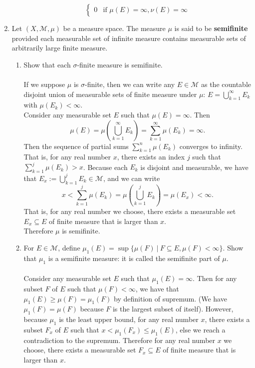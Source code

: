 \begin{enumerate}
\begin{enumerate}[label=(\roman*),align=left]
\[\begin{cases}
			0&\text{if }\mu(E)=\infty,\nu(E)=\infty
		\end{cases}
		\]
	\end{enumerate}
	\item Let $(X,\mathcal{M},\mu)$ be a measure space.
	The measure $\mu$ is said to be \textbf{semifinite} provided each measurable set of infinite measure contains measurable sets of arbitrarily large finite measure.
	\begin{enumerate}[label=(\roman*),align=left]  
		\item Show that each $\sigma$-finite measure is semifinite.\\
		\\If we suppose $\mu$ is $\sigma$-finite, then we can write any $E\in\mathcal{M}$ as the countable disjoint union of measurable sets of finite measure under $\mu$:
		$E=\bigcup_{k=1}^\infty E_k$ with $\mu(E_k)<\infty$.
		\\Consider any measurable set $E$ such that $\mu(E)=\infty$.
		Then 
		\[
			\mu(E)=\mu(\bigcup_{k=1}^\infty E_k)=\sum_{k=1}^\infty \mu(E_k)=\infty.
		\]
		Then the sequence of partial sums $\sum_{k=1}^n \mu(E_k)$ converges to infinity.
		That is, for any real number $x$, there exists an index $j$ such that $\sum_{k=1}^j \mu(E_k)>x$.
		Because each $E_k$ is disjoint and measurable, we have that $E_x:=\bigcup_{k=1}^j E_k\in\mathcal{M}$, and we can write
		\[
			x<\sum_{k=1}^j \mu(E_k)=\mu(\bigcup_{k=1}^j E_k)=\mu(E_x)<\infty.
		\]
		That is, for any real number we choose, there exists a measurable set $E_x\subseteq E$ of finite measure that is larger than $x$.
		\\Therefore $\mu$ is semifinite.
		\item For $E\in\mathcal{M}$, define $\mu_1(E)=\sup\{\mu(F)\ |\ F\subseteq E,\mu(F)<\infty\}$. 
		Show that $\mu_1$ is a semifinite measure: it is called the semifinite part of $\mu$.\\
		\\Consider any measurable set $E$ such that $\mu_1(E)=\infty$.
		Then for any subset $F$ of $E$ such that $\mu(F)<\infty$, we have that $\mu_1(E)\ge\mu(F)=\mu_1(F)$ by definition of supremum.
		(We have $\mu_1(F)=\mu(F)$ because $F$ is the largest subset of itself).
		However, because $\mu_1$ is the least upper bound, for any real number $x$, there exists a subset $F_x$ of $E$ such that $x<\mu_1(F_x)\le\mu_1(E)$, else we reach a contradiction to the supremum.
		Therefore for any real number $x$ we choose, there exists a measurable set $F_x\subseteq E$ of finite measure that is larger than $x$.  

\end{enumerate}
\end{enumerate}
